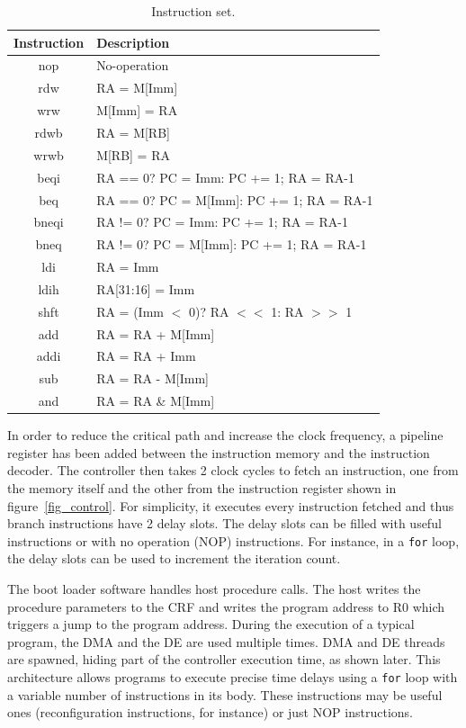 \begin{table}[!htb]
  \renewcommand{\arraystretch}{1.2} %
  \caption{Instruction set.}
  \label{tab:isa}
  \centering
  \begin{tabular}{cl}
    \toprule
    Instruction & Description\\
    \midrule
    nop   & No-operation\\
    rdw   & RA = M[Imm]\\
    wrw   & M[Imm] = RA\\
    rdwb  & RA = M[RB]\\
    wrwb  & M[RB] = RA\\
    beqi  & RA == 0? PC = Imm: PC += 1; RA = RA-1\\
    beq   & RA == 0? PC = M[Imm]: PC += 1; RA = RA-1\\
    bneqi & RA != 0? PC = Imm: PC += 1; RA = RA-1\\
    bneq  & RA != 0? PC = M[Imm]: PC += 1; RA = RA-1\\
    ldi   & RA = Imm\\
    ldih  & RA[31:16] = Imm\\
    shft  & RA = (Imm $<$ 0)? RA $<<$ 1: RA $>>$ 1\\
    add   & RA = RA + M[Imm]\\
    addi  & RA = RA + Imm\\
    sub   & RA = RA - M[Imm]\\
    and   & RA = RA \& M[Imm]\\
    \bottomrule
  \end{tabular}
\end{table}

In order to reduce the critical path and increase the clock frequency,
a pipeline register has been added between the instruction memory and
the instruction decoder. The controller then takes 2 clock cycles to
fetch an instruction, one from the memory itself and the other from
the instruction register shown in figure~\ref{fig_control}. For
simplicity, it executes every instruction fetched and thus branch
instructions have 2 delay slots. The delay slots can be filled with
useful instructions or with no operation (NOP) instructions.  For
instance, in a {\tt for} loop, the delay slots can be used to
increment the iteration count.

The boot loader software handles host procedure calls. The host writes
the procedure parameters to the CRF and writes the program address to
R0 which triggers a jump to the program address. During the execution
of a typical program, the DMA and the DE are used multiple times. DMA
and DE threads are spawned, hiding part of the controller execution
time, as shown later. This architecture allows programs to execute
precise time delays using a {\tt for} loop with a variable number of
instructions in its body. These instructions may be useful ones
(reconfiguration instructions, for instance) or just NOP instructions.

